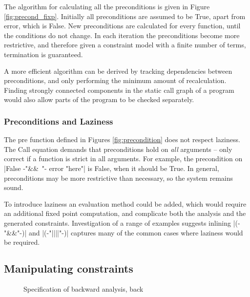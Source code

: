 \documentclass[preprint]{sigplanconf}
\newcommand{\C}[1]{\textsf{#1}}
\begin{document}
The algorithm for calculating all the preconditions is given in Figure \ref{fig:precond_fixp}. Initially all preconditions are assumed to be True, apart from \C{error}, which is False. New preconditions are calculated for every function, until the conditions do not change. In each iteration the preconditions become more restrictive, and therefore given a constraint model with a finite number of terms, termination is guaranteed.

A more efficient algorithm can be derived by tracking dependencies between preconditions, and only performing the minimum amount of recalculation. Finding strongly connected components in the static call graph of a program would also allow parts of the program to be checked separately.

\subsubsection{Preconditions and Laziness}

The \C{pre} function defined in Figures \ref{fig:precondition} does not respect laziness. The \C{Call} equation demands that preconditions hold on \textit{all} arguments -- only correct if a function is strict in all arguments. For example, the precondition on |False {-"\hbox{\textsf{\&\&} }"-} error "here"| is False, when it should be True. In general, preconditions may be more restrictive than necessary, so the system remains sound.

To introduce laziness an evaluation method could be added, which would require an additional fixed point computation, and complicate both the analysis and the generated constraints. Investigation of a range of examples suggests inlining |({-"\hbox{\textsf{\&\&}}"-})| and |({-"||||"-})| captures many of the common cases where laziness would be required.


\subsection{Manipulating constraints}
\label{sec:backward}

\begin{figure}
\caption{Specification of backward analysis, \C{back}}
\label{fig:backward}
\end{figure}
\end{document}

